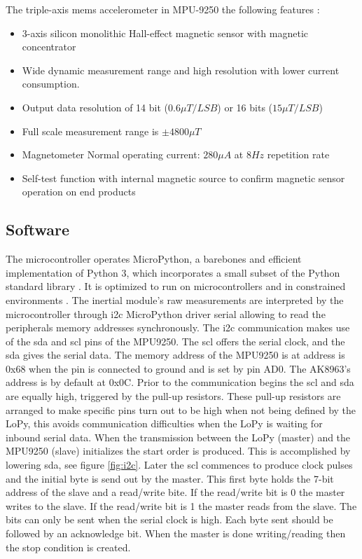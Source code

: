 The triple-axis \acrshort{mems} accelerometer in MPU-9250 the following features \cite{mpu9250specification}:
\begin{itemize}
    \item 3-axis silicon monolithic Hall-effect magnetic sensor with magnetic concentrator
    \item Wide dynamic measurement range and high resolution with lower current consumption.
    \item Output data resolution of 14 bit ($0.6 \mu T/LSB$) or 16 bits ($15 \mu T/LSB$)
    \item Full scale measurement range is $\pm 4800 \mu T$
    \item Magnetometer Normal operating current: $280\mu A$ at $8 Hz$ repetition rate
    \item Self-test function with internal magnetic source to confirm magnetic sensor operation on end products
\end{itemize}



\subsection{Software}

The microcontroller operates MicroPython, a barebones and efficient implementation of Python 3, which incorporates a small subset of the Python standard library \cite{micropython}. It is optimized to run on microcontrollers and in constrained environments \cite{tollervey2017programming}. The inertial module's raw measurements are interpreted by the microcontroller through \acrfull{i2c} MicroPython driver serial allowing to read the peripherals memory addresses synchronously. The \acrshort{i2c} communication makes use of the \acrfull{sda} and \acrfull{scl} pins of the MPU9250. The \acrshort{scl} offers the serial clock, and the \acrshort{sda} gives the serial data. The memory address of the MPU9250 is at address is 0x68 when the pin is connected to ground and is set by pin AD0. The AK8963's address is by default at 0x0C. Prior to the communication begins the \acrshort{scl} and \acrshort{sda} are equally high, triggered by the pull-up resistors. These pull-up resistors are arranged to make specific pins turn out to be high when not being defined by the LoPy, this avoids communication difficulties when the LoPy is waiting for inbound serial data.
When the transmission between the LoPy (master) and the MPU9250 (slave) initializes the start order is produced. This is accomplished by lowering \acrshort{sda}, see figure \ref{fig:i2c}. Later the \acrshort{scl} commences to produce clock pulses and the initial byte is send out by the master. This first byte holds the 7-bit address of the slave and a read/write bite. If the read/write bit is 0 the master writes to the slave. If the read/write bit is 1 the master reads from the slave. The bits can only be sent when the serial clock is high. Each byte sent should be followed by an acknowledge bit. When the master is done writing/reading then the stop condition is created.

